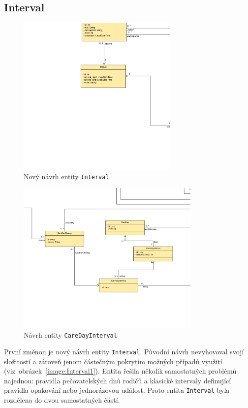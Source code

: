     \subsection{Interval}\label{navrh:upravy:interval}
        \begin{figure}\centering
	        \includegraphics[width=0.7\textwidth]{pdfs/Interval2}
	        \caption[Nový návrh entity \texttt{Interval}]{Nový návrh entity \texttt{Interval}}\label{image:Interval2}
        \end{figure}
        \begin{figure}\centering
	        \includegraphics[width=0.8\textwidth]{pdfs/CareDayInterval}
	        \caption[Návrh entity \texttt{CareDayInterval}]{Návrh entity \texttt{CareDayInterval}}\label{image:careDayInterval}
        \end{figure}
        První změnou je nový návrh entity \verb|Interval|. Původní návrh nevyhovoval svojí složitostí a zároveň jenom částečným pokrytím možných případů využití (viz~obrázek~\ref{image:Interval1}). Entita řešila několik samostatných problémů najednou: pravidla pečovatelských dnů rodičů a klasické intervaly definující pravidla opakování nebo jednorázovou událost. Proto entita \verb|Interval| byla rozdělena do dvou samostatných částí.
